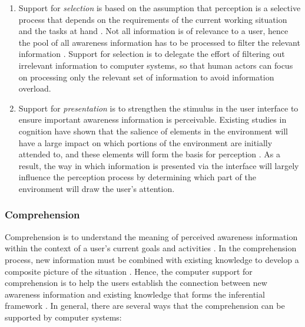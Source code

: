 \begin{enumerate}
   \item Support for \emph{selection} is based on the assumption that perception is a selective process that depends on the requirements of the current working situation and the tasks at hand \cite{Endsley1995}. Not all information is of relevance to a user, hence the pool of all awareness information has to be processed to filter the relevant information \cite{Berlage1999}. Support for selection is to delegate the effort of filtering out irrelevant information to computer systems, so that human actors can focus on processing only the relevant set of information to avoid information overload.
   \item Support for \emph{presentation} is to strengthen the stimulus in the user interface to ensure important awareness information is perceivable. Existing studies in cognition have shown that the salience of elements in the environment will have a large impact on which portions of the environment are initially attended to, and these elements will form the basis for perception \cite{Hegarty2011}. As a result, the way in which information is presented via the interface will largely influence the perception process by determining which part of the environment will draw the user's attention.
\end{enumerate}


\subsubsection*{Comprehension} %
\label{ssub:comprehension}
Comprehension is to understand the meaning of perceived awareness information within the context of a user's current goals and activities \cite{oulasvirta2007a}. In the comprehension process, new information must be combined with existing knowledge to develop a composite picture of the situation \cite{Endsley1995}. Hence, the computer support for comprehension is to help the users establish the connection between new awareness information and existing knowledge that forms the inferential framework \cite{carroll2003a}. In general, there are several ways that the comprehension can be supported by computer systems: 

